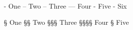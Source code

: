 \documentclass{article}
\begin{document}
\begin{mdenumerate}
- One
-- Two
-- Three
--- Four
- Five
- Six
\end{mdenumerate}

\bigskip


\begin{mdenumerate}
§ One
§§ Two
§§§ Three
§§§§ Four
§ Five
\end{mdenumerate}
\end{document}
